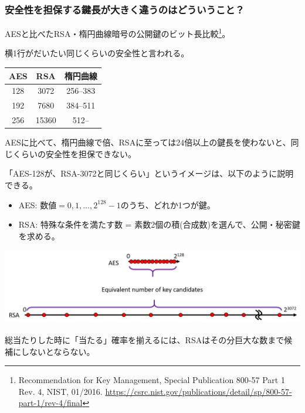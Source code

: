 \documentclass[12pt,dvipdfmx]{beamer}
\begin{document}
\begin{frame}
\frametitle{安全性を担保する鍵長が大きく違うのはどういうこと？}

AESと比べたRSA・楕円曲線暗号の公開鍵のビット長比較\footnote[frame]{\scriptsize Recommendation for Key Management, Special Publication 800-57 Part 1 Rev. 4, NIST, 01/2016. \url{https://csrc.nist.gov/publications/detail/sp/800-57-part-1/rev-4/final}}。

\alert{横1行がだいたい同じくらいの安全性}と言われる。
\begin{table}
\centering
\begin{tabular}{|c||c|c|}
\hline
\textbf{AES} & \textbf{RSA} & \textbf{楕円曲線}\\
\hline
\hline
128 & 3072 & 256--383\\
\hline
192 & 7680 & 384--511\\
\hline
256 & 15360 & 512--\\
\hline
\end{tabular}
\end{table}

\begin{block}{}
AESに比べて、\alert{楕円曲線で倍、RSAに至っては24倍以上}の鍵長を使わないと、同じくらいの安全性を担保できない。
\end{block}


\end{frame}
\begin{frame}
 
「AES-128が、RSA-3072と同じくらい」というイメージは、以下のように説明できる。
\begin{itemize}
 \item AES: 数値$=0,1,\dots,2^{128}-1$のうち、どれか1つが鍵。
 \item RSA: \alert{特殊な条件を満たす数 = 素数2個の積(合成数)}を選んで、公開・秘密鍵を求める。
\end{itemize}

\begin{center}
\includegraphics[width=\linewidth]{Figs/key-length-image.png} %
\end{center}

総当たりした時に\alert{「当たる」確率を揃えるには、RSAはその分巨大な数まで候補にしないとならない}。
\end{frame}
\end{document}
